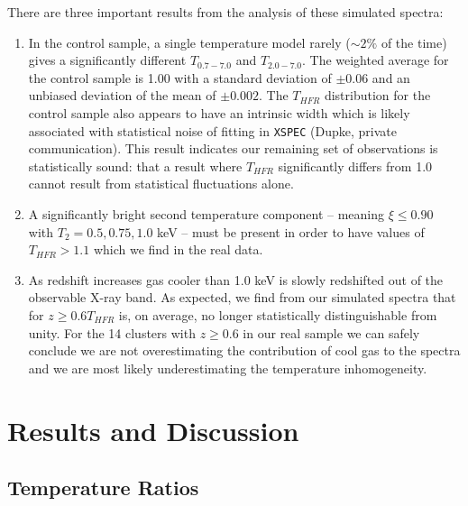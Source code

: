 \documentclass{emulateapj}
\begin{document}
There are three important results from the analysis of these simulated
spectra:
\begin{enumerate}
\item In the control sample, a single temperature model rarely
($\sim 2\%$ of the time) gives a significantly different $T_{0.7-7.0}$ and
$T_{2.0-7.0}$. The weighted average for the control sample is 1.00 with a
standard deviation of $\pm0.06$ and an unbiased deviation of the mean
of $\pm0.002$. The $T_{HFR}$ distribution for the control sample also
appears to have an intrinsic width which is likely associated with
statistical noise of fitting in {\tt XSPEC} (Dupke, private
communication). This result indicates our remaining set of
observations is statistically sound: that a result where $T_{HFR}$
significantly differs from 1.0 cannot result from statistical
fluctuations alone.
\item A significantly bright second temperature component -- meaning $\xi
\leq 0.90$ with $T_2 = 0.5, 0.75, 1.0$ keV -- must be present in order
to have values of $T_{HFR} > 1.1$ which we find in the real data.
\item As redshift increases gas cooler than 1.0 keV is slowly redshifted
out of the observable X-ray band. As expected, we find from our
simulated spectra that for $z \geq 0.6 T_{HFR}$ is, on average, no longer
statistically distinguishable from unity. For the 14 clusters with $z
\geq 0.6$ in our real sample we can safely conclude we are not
overestimating the contribution of cool gas to the spectra and we are
most likely underestimating the temperature inhomogeneity.
\end{enumerate}

\section{Results and Discussion} \label{sec:r&d}

\subsection{Temperature Ratios} \label{sec:tfresults}
\end{document}
